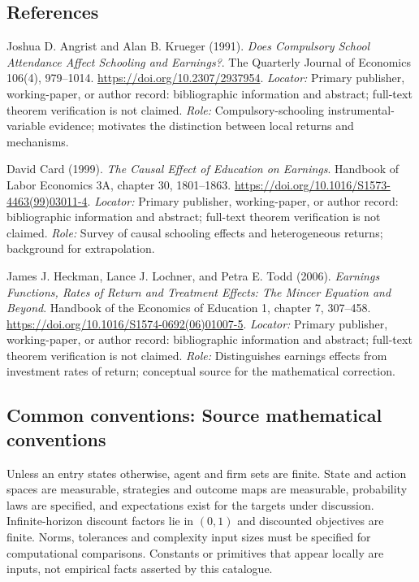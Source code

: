 \documentclass[11pt,a4paper]{article}
\begin{document}
\subsection*{References}
\begin{enumerate}[label=\textnormal{[S\arabic*]},leftmargin=*]
\item Joshua D. Angrist and Alan B. Krueger (1991). \emph{Does Compulsory School Attendance Affect Schooling and Earnings?}. The Quarterly Journal of Economics 106(4), 979--1014. \url{https://doi.org/10.2307/2937954}. \textit{Locator:} Primary publisher, working-paper, or author record: bibliographic information and abstract; full-text theorem verification is not claimed. \textit{Role:} Compulsory-schooling instrumental-variable evidence; motivates the distinction between local returns and mechanisms.
\item David Card (1999). \emph{The Causal Effect of Education on Earnings}. Handbook of Labor Economics 3A, chapter 30, 1801--1863. \url{https://doi.org/10.1016/S1573-4463(99)03011-4}. \textit{Locator:} Primary publisher, working-paper, or author record: bibliographic information and abstract; full-text theorem verification is not claimed. \textit{Role:} Survey of causal schooling effects and heterogeneous returns; background for extrapolation.
\item James J. Heckman, Lance J. Lochner, and Petra E. Todd (2006). \emph{Earnings Functions, Rates of Return and Treatment Effects: The Mincer Equation and Beyond}. Handbook of the Economics of Education 1, chapter 7, 307--458. \url{https://doi.org/10.1016/S1574-0692(06)01007-5}. \textit{Locator:} Primary publisher, working-paper, or author record: bibliographic information and abstract; full-text theorem verification is not claimed. \textit{Role:} Distinguishes earnings effects from investment rates of return; conceptual source for the mathematical correction.
\end{enumerate}

\subsection*{Common conventions: Source mathematical conventions}

Unless an entry states otherwise, agent and firm sets are finite. State and action spaces are measurable, strategies and outcome maps are measurable, probability laws are specified, and expectations exist for the targets under discussion. Infinite-horizon discount factors lie in $(0,1)$ and discounted objectives are finite. Norms, tolerances and complexity input sizes must be specified for computational comparisons. Constants or primitives that appear locally are inputs, not empirical facts asserted by this catalogue.
\end{document}
